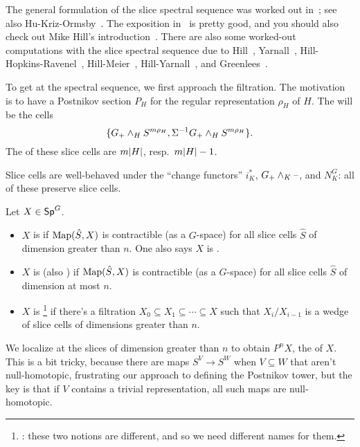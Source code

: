 The general formulation of the slice spectral sequence was worked out in~\cite{HHR}; see also
Hu-Kriz-Ormsby~\cite{HKO11}. The exposition in~\cite{HHR} is pretty good, and you should also check out Mike Hill's
introduction~\cite{HillSlice}.  There are also some worked-out computations with the slice spectral sequence due to
Hill~\cite{HillRealBordism}, Yarnall~\cite{Yarnall}, Hill-Hopkins-Ravenel~\cite{HHR_HZ, HHR_C4},
Hill-Meier~\cite{HillMeier}, Hill-Yarnall~\cite{HillYarnall}, and Greenlees~\cite{GreenCalc}.

To get at the spectral sequence, we first approach the filtration. The motivation is to have a Postnikov section
$P_H$ for the regular representation $\rho_H$ of $H$. The  will be the cells
\[\{G_+\wedge_H S^{m\rho_H}, \Sigma^{-1}G_+\wedge_H S^{m\rho_H}\}.\]
The  of these slice cells are $m\lvert H\rvert$, resp.\ $m\lvert H\rvert - 1$.

Slice cells are well-behaved under the ``change functors'' $i_K^*$, $G_+\wedge_K\text{--}$, and $N_K^G$: all of these
preserve slice cells.
\begin{defn}
Let $X\in\mathsf{Sp}^G$.
\begin{itemize}
	\item $X$ is  if $\operatorname{Map}(\hat S, X)$ is contractible (as a $G$-space) for all slice
	cells $\hat S$ of dimension greater than $n$. One also says $X$ is .
	\item $X$ is  (also ) if $\operatorname{Map}(\hat S, X)$ is contractible (as
	a $G$-space) for all slice cells $\hat S$ of dimension at most $n$.
	\item $X$ is \footnote{\TODO: these two notions are different, and so we need
	different names for them.} if there's a filtration $X_0\subseteq X_1\subseteq\dotsb\subseteq X$ such that
	$X_i/X_{i-1}$ is a wedge of slice cells of dimensions greater than $n$.
\end{itemize}
\end{defn}
We localize at the slices of dimension greater than $n$ to obtain $P^nX$, the 
of $X$. This is a bit tricky, because there are maps $S^V\to S^W$ when $V\subseteq W$ that aren't null-homotopic,
frustrating our approach to defining the Postnikov tower, but the key is that if $V$ contains a trivial
representation, all such maps are null-homotopic.

